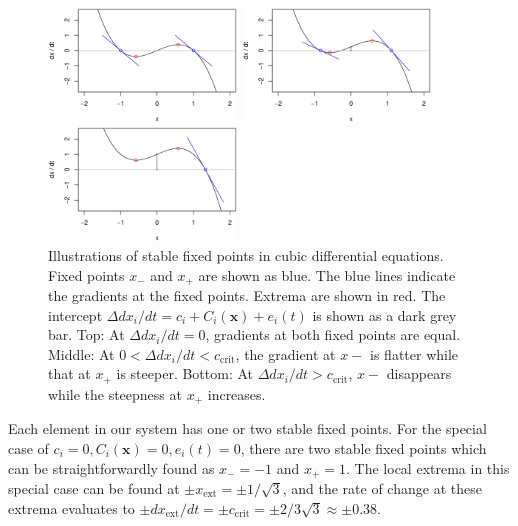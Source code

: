 \documentclass[conference]{IEEEtran}
\newcommand{\vectorsym}[1]{\ensuremath{\mathbf{#1}}}
\newcommand{\xextremum}{\ensuremath{x_{\mathrm{ext}}}}
\newcommand{\ccrit}{\ensuremath{c_{\mathrm{crit}}}}
\newcommand{\agentimpact}{\ensuremath{e}}
\newcommand{\couplingfunction}{\ensuremath{C}}
\begin{document}
\begin{figure}

  \centerline{\includegraphics[width=5cm]{cubicdemo_intercept000.eps}}

  \centerline{\includegraphics[width=5cm]{cubicdemo_intercept025.eps}}

  \centerline{\includegraphics[width=5cm]{cubicdemo_intercept100.eps}}

  \caption{Illustrations of stable fixed points in cubic differential
    equations. Fixed points $x_{-}$ and $x_{+}$ are shown as blue. The
    blue lines indicate the gradients at the fixed points. Extrema are
    shown in red. The intercept
    $\Delta dx_i / dt = c_i + \couplingfunction_i(\vectorsym{x}) + \agentimpact_i(t)$ is
    shown as a dark grey bar. Top: At $\Delta dx_i / dt = 0$,
    gradients at both fixed points are equal. Middle: At
    $0 < \Delta dx_i / dt < \ccrit$, the gradient at $x{-}$ is flatter
    while that at $x_{+}$ is steeper. Bottom: At
    $\Delta dx_i / dt > \ccrit$, $x{-}$ disappears while the steepness
    at $x_{+}$ increases.}
  \label{fig_cubicdemo}

\end{figure}

Each element in our system has one or two stable fixed points. For the
special case of
$c_i = 0, \couplingfunction_i(\vectorsym{x}) = 0, \agentimpact_i(t) = 0$, there are two
stable fixed points which can be straightforwardly found as
$x_{-} = -1$ and $x_{+} = 1$. The local extrema in this special case
can be found at $\pm \xextremum = \pm 1 / \sqrt{3}$, and the rate of
change at these extrema evaluates to
$\pm d\xextremum / dt = \pm \ccrit = \pm 2 / 3\sqrt{3} \approx \pm
0.38$.
\end{document}
